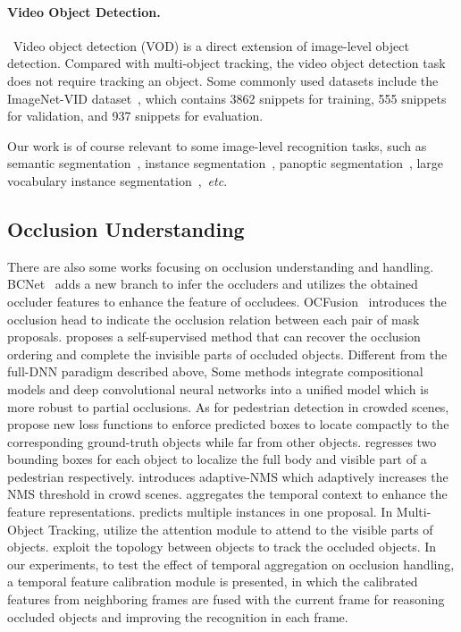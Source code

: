 \documentclass[twocolumn]{svjour3}          \smartqed  \usepackage{graphicx}
\newcommand{\etc}{\textit{etc}.}
\def\myTextColor{\textcolor[rgb]{0, 0, 0}}
\begin{document}
\begin{sloppypar}
\myTextColor{\paragraph{Video Object Detection.}~Video object detection (VOD) is a direct extension of image-level object detection. Compared with multi-object tracking, the video object detection task does not require tracking an object. Some commonly used datasets include the ImageNet-VID dataset~\cite{imagenet}, which contains 3862 snippets for training, 555 snippets for validation, and 937 snippets for evaluation.}

Our work is of course relevant to some image-level recognition tasks, such as semantic segmentation~\cite{fcn,deeplapv1,deeplabv3}, instance segmentation~\cite{maskrcnn,maskscore,pointrend}, panoptic segmentation~\cite{panoptic0,panoptic1,panoptic2}, large vocabulary instance segmentation~\cite{lvis,lvis1},~\etc

\subsection{Occlusion Understanding}

There are also some works focusing on occlusion understanding and handling. BCNet~\cite{bcnet} adds a new branch to infer the occluders and utilizes the obtained occluder features to enhance the feature of occludees. OCFusion~\cite{lazarow2020learning} introduces the occlusion head to indicate the occlusion relation between each pair of mask proposals. \cite{deocclusion} proposes a self-supervised method that can recover the occlusion ordering and complete the invisible parts of occluded objects. Different from the full-DNN paradigm described above, Some methods\cite{compositional,compositional2,compositional3} integrate compositional models and deep convolutional neural networks into a unified model which is more robust to partial occlusions. As for pedestrian detection in crowded scenes, \cite{repulsion,orcnn} propose new loss functions to enforce predicted boxes to locate compactly to the corresponding ground-truth objects while far from other objects. \cite{bibox}  regresses two bounding boxes for each object to localize the full body and visible part of a pedestrian respectively. \cite{adaptivenms} introduces adaptive-NMS which adaptively increases the NMS threshold in crowd scenes. \cite{tced} aggregates the temporal context to enhance the feature representations. \cite{oneproposal} predicts multiple instances in one proposal. \myTextColor{In Multi-Object Tracking, \cite{mot_attn_occ1,mot_attn_occ2} utilize the attention module to attend to the visible parts of objects. \cite{mot_topo_occ1,mot_topo_occ2} exploit the topology between objects to track the occluded objects.}
In our experiments, to test the effect of temporal aggregation on occlusion handling, a temporal feature calibration module is presented, in which the calibrated features from neighboring frames are fused with the current frame for reasoning occluded objects and improving the recognition in each frame.




\end{sloppypar}
\end{document}
